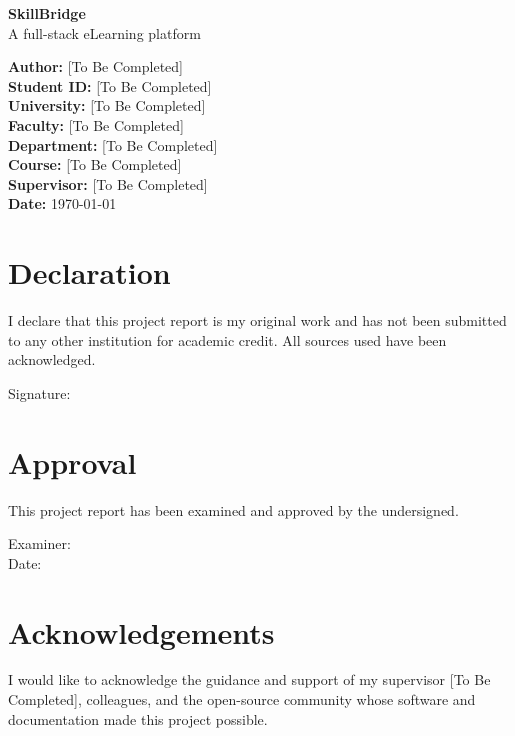 \documentclass[12pt,a4paper]{report}
\begin{document}
\begin{titlepage}
  \begin{center}
    \vspace*{1cm}
    {\LARGE \textbf{SkillBridge}}\\[0.5cm]
    {\Large A full-stack eLearning platform}\
    \vspace{2cm}

    \textbf{Author:} [To Be Completed]\\[0.2cm]
    \textbf{Student ID:} [To Be Completed]\\[0.2cm]
    \textbf{University:} [To Be Completed]\\[0.2cm]
    \textbf{Faculty:} [To Be Completed]\\[0.2cm]
    \textbf{Department:} [To Be Completed]\\[0.2cm]
    \textbf{Course:} [To Be Completed]\\[0.2cm]
    \textbf{Supervisor:} [To Be Completed]\\[0.2cm]
    \vfill
    \textbf{Date:} \today
  \end{center}
\end{titlepage}

\chapter*{Declaration}
I declare that this project report is my original work and has not been submitted to any other institution for academic credit. All sources used have been acknowledged.

\vspace{2em}
Signature: \hrulefill 

\clearpage

\chapter*{Approval}
This project report has been examined and approved by the undersigned.

\vspace{2em}
Examiner: \hrulefill \\
Date: \hrulefill

\clearpage

\chapter*{Acknowledgements}
I would like to acknowledge the guidance and support of my supervisor [To Be Completed], colleagues, and the open-source community whose software and documentation made this project possible.
\end{document}
